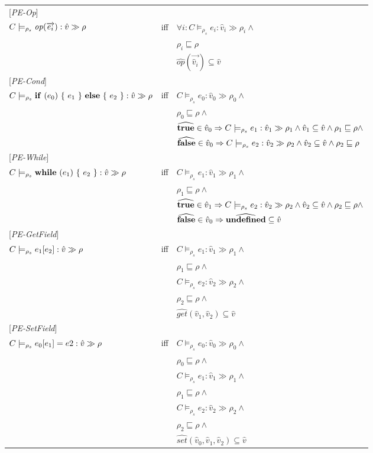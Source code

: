 \documentclass[[12pt,a4paper,twoside,openrigh]{article}
\newcommand{\vat}[0]{\hat{v}}
\newcommand{\modelrho}{\models_{\rho_s}}
\newcommand{\caesti}[2]{C \modelrho #1 : \vat_{#2} \gg \rho_{#2}}
\newcommand{\caest}[1]{C \modelrho #1 : \vat \gg \rho}
\begin{document}
\begin{tabular}{l l l}
{[\textit{PE-Op}]} \\
$\caest {\op (\vec{e_i})} $& iff &$\forall i : \caesti {e_i} {i} \wedge $\\
&& $\rho_i \sqsubseteq \rho$\\
&& $\widehat{op} (\vec{\vat_i}) \subseteq \vat $\\
{[\textit{PE-Cond}]}\\
$\caest {\cond {e_0} {e_1} {e_2}} $& iff &$ \caesti {e_0} {0} \wedge $\\
&& $\rho_0 \sqsubseteq \rho \wedge$ \\
&& $\widehat{\true} \in \vat_0 \Rightarrow \caesti {e_1} {1} \wedge \vat_1 \subseteq \vat \wedge \rho_1 \sqsubseteq \rho \wedge$ \\
&& $\widehat{\false} \in \vat_0 \Rightarrow \caesti {e_2} {2} \wedge \vat_2 \subseteq \vat \wedge \rho_2 \sqsubseteq \rho$ \\
{[\textit{PE-While}]}\\
$\caest {\while {e_1} {e_2}} $& iff &$ \caesti {e_1} {1} \wedge $\\
&& $\rho_1 \sqsubseteq \rho \wedge$ \\
&& $\widehat{\true} \in \vat_1 \Rightarrow \caesti {e_2} {2} \wedge \vat_2 \subseteq \vat \wedge \rho_2 \sqsubseteq \rho \wedge$\\
&& $\widehat{\false} \in \vat_0 \Rightarrow \widehat{\undef} \subseteq \vat$\\
{[\textit{PE-GetField}]}\\
$\caest {\lookup {e_1} {e_2}} $& iff &$ \caesti {e_1} {1} \wedge $\\
&& $\rho_1 \sqsubseteq \rho \wedge$ \\
&& $ \caesti {e_2} {2} \wedge $ \\
&& $\rho_2 \sqsubseteq \rho \wedge$ \\
&& $\widehat{get} (\vat_1, \vat_2) \subseteq \vat$ \\
{[\textit{PE-SetField}]}\\
$\caest {\store {e_0} {e_1} {e2}} $& iff &$ \caesti {e_0} {0} \wedge $\\
&& $\rho_0 \sqsubseteq \rho \wedge$ \\
&& $ \caesti {e_1} {1} \wedge $ \\
&& $\rho_1 \sqsubseteq \rho \wedge$ \\
&& $ \caesti {e_2} {2} \wedge $ \\
&& $\rho_2 \sqsubseteq \rho \wedge$ \\
&& $\widehat{set} (\vat_0, \vat_1, \vat_2) \subseteq \vat$ \\
\end{tabular}
\end{document}

